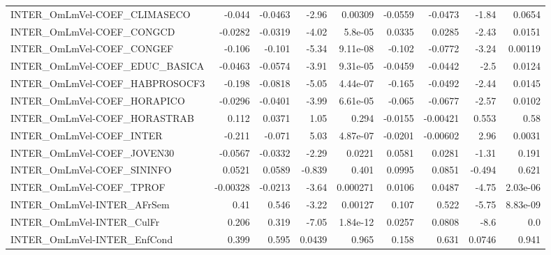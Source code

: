 \begin{tabular}{lrrrrrrrr}
INTER\_OmLmVel-COEF\_CLIMASECO          &      -0.044 &      -0.0463 &    -2.96 &  0.00309 &    -0.0559 &     -0.0473 &        -1.84 &        0.0654 \\
INTER\_OmLmVel-COEF\_CONGCD             &     -0.0282 &      -0.0319 &    -4.02 &  5.8e-05 &     0.0335 &      0.0285 &        -2.43 &        0.0151 \\
INTER\_OmLmVel-COEF\_CONGEF             &      -0.106 &       -0.101 &    -5.34 & 9.11e-08 &     -0.102 &     -0.0772 &        -3.24 &       0.00119 \\
INTER\_OmLmVel-COEF\_EDUC\_BASICA        &     -0.0463 &      -0.0574 &    -3.91 & 9.31e-05 &    -0.0459 &     -0.0442 &         -2.5 &        0.0124 \\
INTER\_OmLmVel-COEF\_HABPROSOCF3        &      -0.198 &      -0.0818 &    -5.05 & 4.44e-07 &     -0.165 &     -0.0492 &        -2.44 &        0.0145 \\
INTER\_OmLmVel-COEF\_HORAPICO           &     -0.0296 &      -0.0401 &    -3.99 & 6.61e-05 &     -0.065 &     -0.0677 &        -2.57 &        0.0102 \\
INTER\_OmLmVel-COEF\_HORASTRAB          &       0.112 &       0.0371 &     1.05 &    0.294 &    -0.0155 &    -0.00421 &        0.553 &          0.58 \\
INTER\_OmLmVel-COEF\_INTER              &      -0.211 &       -0.071 &     5.03 & 4.87e-07 &    -0.0201 &    -0.00602 &         2.96 &        0.0031 \\
INTER\_OmLmVel-COEF\_JOVEN30            &     -0.0567 &      -0.0332 &    -2.29 &   0.0221 &     0.0581 &      0.0281 &        -1.31 &         0.191 \\
INTER\_OmLmVel-COEF\_SININFO            &      0.0521 &       0.0589 &   -0.839 &    0.401 &     0.0995 &      0.0851 &       -0.494 &         0.621 \\
INTER\_OmLmVel-COEF\_TPROF              &    -0.00328 &      -0.0213 &    -3.64 & 0.000271 &     0.0106 &      0.0487 &        -4.75 &      2.03e-06 \\
INTER\_OmLmVel-INTER\_AFrSem            &        0.41 &        0.546 &    -3.22 &  0.00127 &      0.107 &       0.522 &        -5.75 &      8.83e-09 \\
INTER\_OmLmVel-INTER\_CulFr             &       0.206 &        0.319 &    -7.05 & 1.84e-12 &     0.0257 &      0.0808 &         -8.6 &           0.0 \\
INTER\_OmLmVel-INTER\_EnfCond           &       0.399 &        0.595 &   0.0439 &    0.965 &      0.158 &       0.631 &       0.0746 &         0.941 \\

\end{tabular}
